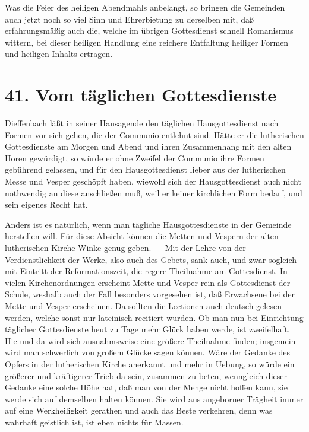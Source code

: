 Was die Feier des heiligen Abendmahls anbelangt, so bringen die Gemeinden auch jetzt noch so viel Sinn und Ehrerbietung zu derselben mit, daß erfahrungsmäßig auch die, welche im übrigen Gottesdienst schnell Romanismus wittern, bei dieser heiligen Handlung eine reichere Entfaltung heiliger Formen und heiligen Inhalts ertragen.

\section{41. Vom täglichen Gottesdienste}

Dieffenbach läßt in seiner Hausagende den täglichen Hausgottesdienst nach Formen vor sich gehen, die der Communio entlehnt sind. Hätte er die lutherischen Gottesdienste am Morgen und Abend und ihren Zusammenhang mit den alten Horen gewürdigt, so würde er ohne Zweifel der Communio ihre Formen gebührend gelassen, und für den Hausgottesdienst lieber aus der lutherischen Messe und Vesper geschöpft haben, wiewohl sich der Hausgottesdienst auch nicht
nothwendig an diese anschließen muß, weil er keiner kirchlichen Form bedarf, und sein eigenes Recht hat.

Anders ist es natürlich, wenn man tägliche Hausgottesdienste in der Gemeinde herstellen will. Für diese Absicht können die Metten und Vespern der alten lutherischen Kirche Winke genug geben. — Mit der Lehre von der Verdienstlichkeit der Werke, also auch des Gebets, sank auch, und zwar sogleich mit Eintritt der Reformationszeit, die regere Theilnahme am Gottesdienst. In vielen Kirchenordnungen erscheint Mette und Vesper rein als Gottesdienst der Schule, weshalb auch der Fall besonders vorgesehen ist, daß Erwachsene bei der Mette und Vesper erscheinen. Da sollten die Lectionen auch deutsch gelesen werden, welche sonst nur lateinisch recitiert wurden. Ob man nun bei Einrichtung täglicher Gottesdienste heut zu Tage mehr Glück haben werde, ist zweifelhaft. Hie und da wird sich ausnahmsweise eine größere Theilnahme finden; insgemein wird man schwerlich von großem Glücke sagen können. Wäre der Gedanke des Opfers in der lutherischen Kirche anerkannt und mehr in Uebung, so würde ein größerer und kräftigerer Trieb da sein, zusammen zu beten, wenngleich dieser Gedanke eine solche Höhe hat, daß man von der Menge nicht hoffen kann, sie werde sich auf demselben halten können. Sie wird aus angeborner Trägheit immer auf eine Werkheiligkeit gerathen und auch das Beste verkehren, denn was wahrhaft geistlich ist, ist eben nichts für Massen.

